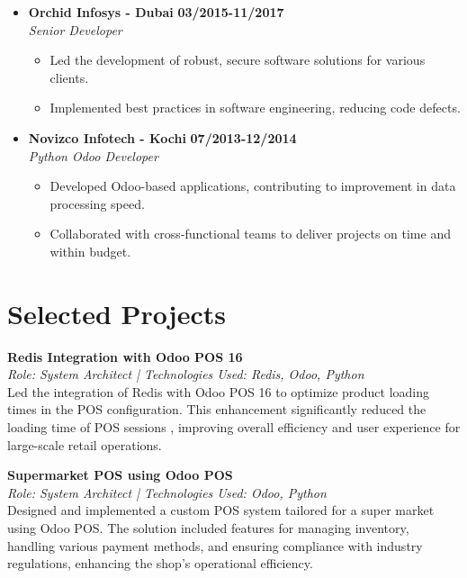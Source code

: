 \documentclass[a4paper,10pt]{article}
\begin{document}
\begin{itemize}[left=0pt, label=$\vcenter{\hbox{\tiny$\bullet$}}$]
    \item \textbf{Orchid Infosys - Dubai} \hfill \textbf{03/2015-11/2017} \\
    \textit{Senior Developer} \\
    \begin{itemize}[left=5pt, label=$\vcenter{\hbox{\tiny$\bullet$}}$]
        \item Led the development of robust, secure software solutions for various clients.
        \item Implemented best practices in software engineering, reducing code defects.
    \end{itemize}

    \item \textbf{Novizco Infotech - Kochi} \hfill \textbf{07/2013-12/2014} \\
    \textit{Python Odoo Developer} \\
    \begin{itemize}[left=5pt, label=$\vcenter{\hbox{\tiny$\bullet$}}$]
        \item Developed Odoo-based applications, contributing to improvement in data processing speed.
        \item Collaborated with cross-functional teams to deliver projects on time and within budget.
    \end{itemize}
\end{itemize}

\vspace{5mm}


\section*{\textcolor{primary}{Selected Projects}}

\textbf{Redis Integration with Odoo POS 16 } \\
\textit{Role: System Architect | Technologies Used: Redis, Odoo, Python} \\
Led the integration of Redis with Odoo POS 16 to optimize product loading times in the POS configuration. This enhancement significantly reduced the loading time of POS sessions , improving overall efficiency and user experience for large-scale retail operations.

\vspace{3mm}

\textbf{Supermarket POS using Odoo POS} \\
\textit{Role: System Architect | Technologies Used: Odoo, Python} \\
Designed and implemented a custom POS system tailored for a super market using Odoo POS. The solution included features for managing inventory, handling various payment methods, and ensuring compliance with industry regulations, enhancing the shop's operational efficiency.
\end{document}
